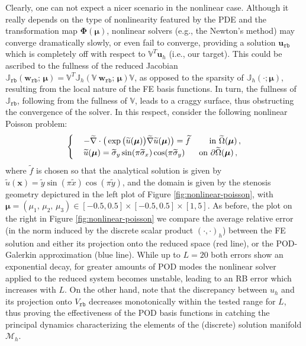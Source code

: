 \documentclass[12pt, a4paper, twoside, openright]{report}
\numberwithin{equation}{chapter}
\theoremstyle{theorem}
\theoremstyle{definition}
\theoremstyle{remark}
\theoremstyle{proposition}
\numberwithin{figure}{chapter}
\newcommand{\wt}[1]{\widetilde{#1}}
\newcommand{\bg}[1]{\boldsymbol{#1}}
\begin{document}
		Clearly, one can not expect a nicer scenario in the nonlinear case. Although it really depends on the type of nonlinearity featured by the PDE and the transformation map $\bg{\Phi}(\bg{\mu})$, nonlinear solvers (e.g., the Newton's method) may converge dramatically slowly, or even fail to converge, providing a solution $\mathbf{u}_{\texttt{rb}}$ which is completely off with respect to $\mathbb{V}^T \mathbf{u}_h$ (i.e., our target). This could be ascribed to the fullness of the reduced Jacobian $\mathbb{J}_{\texttt{rb}}(\mathbf{w}_{\texttt{rb}}; \, \bg{\mu}) = \mathbb{V}^T \mathbb{J}_h(\mathbb{V} ~ \mathbf{w}_{\texttt{rb}}; \, \bg{\mu}) \mathbb{V}$, as opposed to the sparsity of $\mathbb{J}_h(\cdot; \bg{\mu})$, resulting from the local nature of the FE basis functions. In turn, the fullness of $\mathbb{J}_{\texttt{rb}}$, following from the fullness of $\mathbb{V}$, leads to a craggy surface, thus obstructing the convergence of the solver. In this respect, consider the following nonlinear Poisson problem:
		\begin{equation}
			\label{eq:nonlinear-poisson}
			\begin{cases}
				& - \wt{\nabla} \cdot \big( \exp \big(\wt{u}(\bg{\mu}) \big) \wt{\nabla} \wt{u}(\bg{\mu}) \big) = \wt{f} \hspace*{0.8cm} \text{in $\wt{\Omega}(\boldsymbol{\mu})$} \, , \\
				& \wt{u}(\bg{\mu}) = \wt{\sigma}_y \sin(\pi \wt{\sigma}_x) \cos(\pi \wt{\sigma}_y) \hspace*{0.6cm} \text{on $\partial \wt{\Omega}(\boldsymbol{\mu})$} \, ,
			\end{cases}
		\end{equation}
		where $\wt{f}$ is chosen so that the analytical solution is given by $\wt{u}(\bg{x}) = \wt{y} \sin(\pi \wt{x}) \cos(\pi \wt{y})$, and the domain is given by the stenosis geometry depictured in the left plot of Figure \ref{fig:nonlinear-poisson}, with $\bg{\mu} = (\mu_1, \, \mu_2, \, \mu_3) \in [-0.5,0.5] \times [-0.5,0.5] \times [1,5]$. As before, the plot on the right in Figure \ref{fig:nonlinear-poisson} we compare the average relative error (in the norm induced by the discrete scalar product $(\cdot,\cdot)_h$) between the FE solution and either its projection onto the reduced space (red line), or the POD-Galerkin approximation (blue line). While up to $L = 20$ both errors show an exponential decay, for greater amounts of POD modes the nonlinear solver applied to the reduced system becomes unstable, leading to an RB error which increases with $L$. On the other hand, note that the discrepancy between $u_h$ and its projection onto $V_{\texttt{rb}}$ decreases monotonically within the tested range for $L$, thus proving the effectiveness of the POD basis functions in catching the principal dynamics characterizing the elements of the (discrete) solution manifold $\mathcal{M}_h$. 
		
\end{document}
